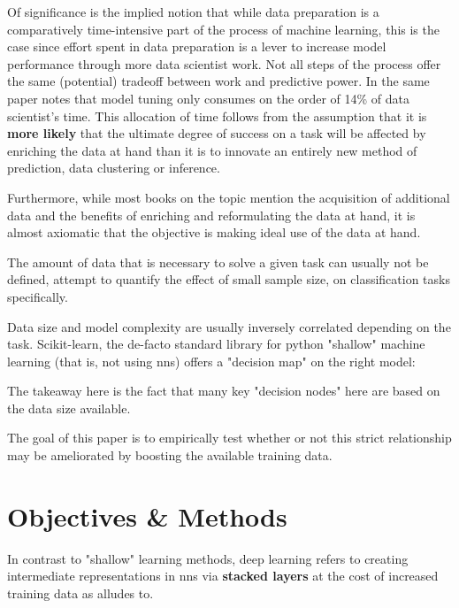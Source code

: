 Of significance is the implied notion that while data preparation is a comparatively time-intensive part of the process of machine learning, this is the case since effort spent in data preparation is a lever to increase model performance through more data scientist work. Not all steps of the process offer the same (potential) tradeoff between work and predictive power. In the same paper \cite{datawrangling_time} notes that model tuning only consumes on the order of 14\% of data scientist's time. This allocation of time follows from the assumption that it is \textbf{more likely} that the ultimate degree of success on a task will be affected by enriching the data at hand than it is to innovate an entirely new method of prediction, data clustering or inference.

Furthermore, while most books on the topic mention the acquisition of additional data and the benefits of enriching and reformulating the data at hand, it is almost axiomatic that the objective is making ideal use of the data at hand.

The amount of data that is necessary to solve a given task can usually not be defined, \cite{raudys1991small} attempt to quantify the effect of small sample size, on classification tasks specifically.

\pagebreak

Data size and model complexity are usually inversely correlated depending on the task. Scikit-learn, the de-facto standard library for python "shallow" machine learning (that is, not using \acp{nn}) offers a "decision map" on the right model:


The takeaway here is the fact that many key "decision nodes" here are based on the data size available.

The goal of this paper is to empirically test whether or not this strict relationship may be ameliorated by boosting the available training data.

\pagebreak

\section{Objectives \& Methods}

In contrast to "shallow" learning methods, deep learning refers to creating intermediate representations in \acp{nn} via \textbf{stacked layers} at the cost of increased training data as \cite{swingler1996applying} alludes to.

